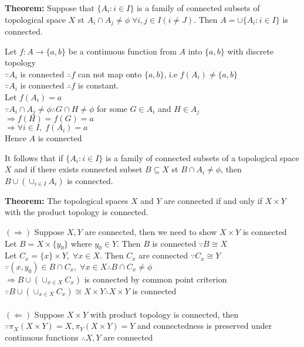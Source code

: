 \documentclass{article}
\begin{document}
\textbf{Theorem:} Suppose that $\{A_i: i \in I\}$ is a family of connected subsets of topological space $X$ st $A_i \cap A_j \not= \phi \; \forall i,j \in I (i \not= J)$. Then $A = \cup \{A_i: i \in I\}$ is connected.
\begin{tcolorbox}[colback=lightgray!10,colframe=lightgray!10, fontupper=\linespread{1.5}\selectfont]
	Let $f: A \rightarrow \{a,b\}$ be a continuous function from $A$ into $\{a,b\}$ with discrete topology \\
	$\because A_i$ is connected $\therefore f$ can not map onto $\{a,b\}$, i.e $f(A_i) \not= \{a,b\}$ \\
	$\because A_i$ is connected $\therefore f$ is constant. \\
	Let $f(A_i) = a$\\
	$\because A_i \cap A_j \not= \phi \therefore G \cap H  \not= \phi$ for some $G \in A_i$ and $H \in A_j$ \\
	$\Rightarrow f(H) = f(G) = a$ \\
	$\Rightarrow \forall i \in I, \; f(A_i) = a$ \\
	Hence $A$ is connected
\end{tcolorbox}
It follows that if $\{A_i: i \in I\}$ is a family of connected subsets of a topological space $X$ and if there exists connected subset $B \subseteq X$ st $B \cap A_i \not= \phi$, then $B \cup (\cup_{i \in I}A_i)$ is connected.

\textbf{Theorem:} The topological spaces $X$ and $Y$ are connected if and only if $X \times Y$ with the product topology is connected.
\begin{tcolorbox}[colback=lightgray!10,colframe=lightgray!10, fontupper=\linespread{1.5}\selectfont]
	$(\Rightarrow)$ Suppose $X,Y$ are connected, then we need to show $X \times Y$ is connected \\
	Let $B = X \times \{y_0\}$ where $y_0 \in Y$. Then $B$ is connected $\because B \cong X$ \\
	Let $C_x = \{x\} \times Y, \; \forall x \in X$. Then $C_x$ are connected $\because C_x \cong Y$ \\
	$\because (x,y_0) \in B \cap C_x, \; \forall x \in X \therefore B \cap C_x \not= \phi$ \\
	$\Rightarrow B\cup(\cup_{x \in X} C_x)$ is connected by common point criterion \\
	$\because B\cup(\cup_{x \in X} C_x) \cong X \times Y \therefore X \times Y$ is connected \\\\
	$(\Leftarrow)$ Suppose $X \times Y$ with product topology is connected, then $\because \pi_X(X \times Y) = X, \pi_Y(X \times Y) = Y$ and connectedness is preserved under continuous functions $\therefore X,Y$ are connected
\end{tcolorbox}
\end{document}
